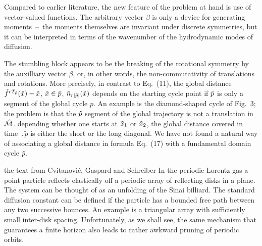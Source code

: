 Compared to earlier literature, the new feature of the
problem at hand is use of vector-valued functions. The arbitrary vector
$\beta$ is only a device for generating moments~--~the moments themselves
are invariant under discrete symmetries, but it can be interpreted in
terms of the wavenumber of the hydrodynamic modes of diffusion.

The stumbling block
appears to be
 the breaking of the rotational symmetry by
 the auxilliary vector $\beta$, or, in other words,
the non-commutativity of translations and rotations.
More precisely,
in contrast to Eq.~(11), the global distance
$ \hat f^{r {T_{\tilde{p}}}} (\tilde x{}) - \tilde x{} $, $\tilde x{} \in {\tilde p}$,
 $ \hat{n}_{r |\tilde p|}(\tilde x{}) $
depends on the starting cycle point if
${\tilde p}$ is only a segment of the global cycle $p$. An
example is the diamond-shaped cycle of Fig.~3;
the problem is that the ${\tilde p}$ segment of
the global trajectory is not a translation in $\hat {{\cal M}}$.
depending whether one starts at $\tilde x_1$ or $\tilde x_2$, the global
distance covered in time $\period{\tilde{p}}$ is either the short or the
long diagonal. We have not found a natural way of associating
a global distance in  formula Eq.~(17) with a fundamental domain
cycle ${\tilde p}$.

    {the text from Cvitanovi\'c, Gaspard and Schreiber}
In the periodic Lorentz gas
a point particle reflects elastically off
a periodic array of reflecting disks in a plane.
The system can
be thought of as an unfolding of the Sinai billiard.
The standard diffusion constant can be defined if the particle has a bounded
free path between any two successive bounces.
An example is a triangular array with sufficiently small
inter-disk spacing.
Unfortunately, as we shall see,
the same mechanism that guarantees a finite horizon
also leads to rather awkward pruning of periodic orbits.

